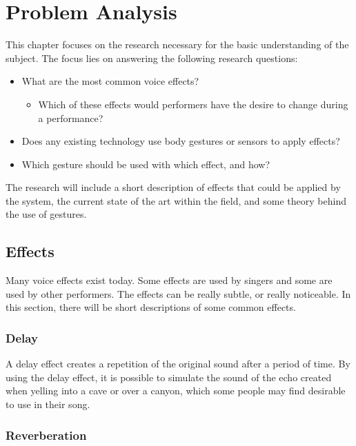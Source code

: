 \chapter{Problem Analysis}
This chapter focuses on the research necessary for the basic understanding of the subject. The focus lies on answering the following research questions:

\begin{itemize}
	\item What are the most common voice effects?
	\begin{itemize}
		\item Which of these effects would performers have the desire to change during a performance?
	\end{itemize}
	\item Does any existing technology use body gestures or sensors to apply effects?
	\item Which gesture should be used with which effect, and how?
\end{itemize}

The research will include a short description of effects that could be applied by the system, the current state of the art within the field, and some theory behind the use of gestures.

\section{Effects}
Many voice effects exist today. Some effects are used by singers and some are used by other performers. The effects can be really subtle, or really noticeable.
In this section, there will be short descriptions of some common effects.


\subsection{Delay}

A delay effect creates a repetition of the original sound after a period of time\citep{Loeffler_2014}. By using the delay effect, it is possible to simulate the sound of the echo created when yelling into a cave or over a canyon, which some people may find desirable to use in their song. 

\subsection{Reverberation}

